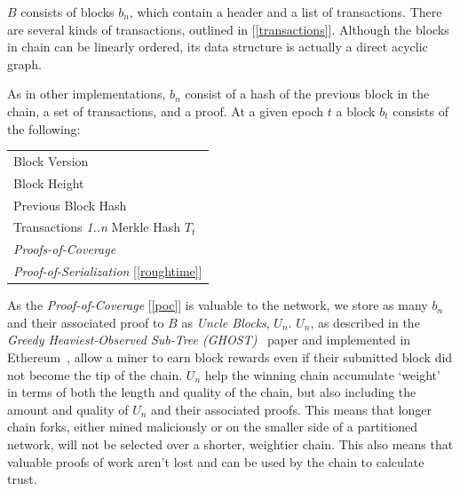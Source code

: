 \documentclass[letterpaper,11pt]{article}
\begin{document}
$B$ consists of blocks $b_n$, which contain a header and a list of transactions. There are several kinds of transactions, outlined in [\ref{transactions}]. Although the blocks in chain can be linearly ordered, its data structure is actually a direct acyclic graph.

As in other implementations, $b_n$ consist of a hash of the previous block in the chain, a set of transactions, and a proof. At a given epoch $t$ a block $b_t$ consists of the following:

\begin{center}
    \begin{tabular}{l}
         Block Version \\
         Block Height \\
         Previous Block Hash \\
         Transactions \emph{1..n} Merkle Hash $T_t$ \\
         \emph{Proofs-of-Coverage} \\
         \emph{Proof-of-Serialization} [\ref{roughtime}]\\
    \end{tabular}
\end{center}

As the \emph{Proof-of-Coverage} [\ref{poc}] is valuable to the network, we store as many $b_n$ and their associated proof to $B$ as \emph{Uncle Blocks}, $U_n$. $U_n$, as described in the \emph{Greedy Heaviest-Observed Sub-Tree (GHOST)}~\cite{ghost} paper and implemented in Ethereum~\cite{ethereum}, allow a miner to earn block rewards even if their submitted block did not become the tip of the chain. $U_n$ help the winning chain accumulate `weight' in terms of both the length and quality of the chain, but also including the amount and quality of $U_n$ and their associated proofs. This means that longer chain forks, either mined maliciously or on the smaller side of a partitioned network, will not be selected over a shorter, weightier chain. This also means that valuable proofs of work aren't lost and can be used by the chain to calculate trust.
\end{document}
